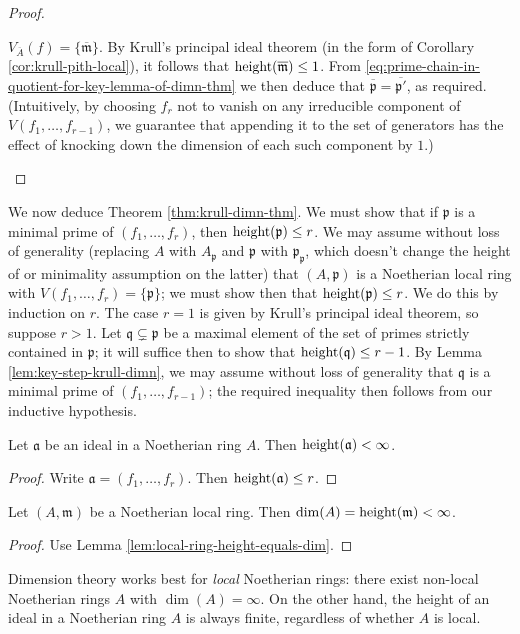 \documentclass[10pt]{article}
\begin{document}
\begin{proof}
\begin{enumerate}
    $V_{\overline{A}}(f)
    = \{\overline{\mathfrak{m}}\}$.    
    By Krull's principal
    ideal theorem (in the form of Corollary \ref{cor:krull-pith-local}),
    it follows that $\operatorname{height}(\overline{\mathfrak{m} }) \leq 1$.
    From
    \eqref{eq:prime-chain-in-quotient-for-key-lemma-of-dimn-thm}
    we then deduce that $\overline{\mathfrak{p} } =
    \overline{\mathfrak{p}'}$,
    as required.
    (Intuitively, by choosing $f_r$ not to vanish on any irreducible component
    of $V(f_1,\dotsc,f_{r-1})$,
    we guarantee that appending it to the set of generators has the effect
    of knocking down the dimension of each such component by $1$.)
  \end{enumerate}
\end{proof}

We now deduce Theorem \ref{thm:krull-dimn-thm}.  We must show that if \(\mathfrak{p}\) is a minimal prime of \((f_1,\dotsc,f_r)\), then \(\operatorname{height}(\mathfrak{p}) \leq r\).  We may assume without loss of generality (replacing \(A\) with \(A_\mathfrak{p}\) and \(\mathfrak{p}\) with \(\mathfrak{p}_\mathfrak{p}\), which doesn't change the height of or minimality assumption on the latter) that \((A,\mathfrak{p})\) is a Noetherian local ring with \(V(f_1,\dotsc,f_r) = \{\mathfrak{p}\}\); we must show then that \(\operatorname{height}(\mathfrak{p}) \leq r\).  We do this by induction on \(r\).  The case \(r = 1\) is given by Krull's principal ideal theorem, so suppose \(r > 1\).  Let \(\mathfrak{q} \subsetneq \mathfrak{p}\) be a maximal element of the set of primes strictly contained in \(\mathfrak{p}\); it will suffice then to show that \(\operatorname{height}(\mathfrak{q}) \leq r-1\).  By Lemma \ref{lem:key-step-krull-dimn}, we may assume without loss of generality that \(\mathfrak{q}\) is a minimal prime of \((f_1,\dotsc,f_{r-1})\); the required inequality then follows from our inductive hypothesis.

\begin{corollary}
  Let $\mathfrak{a}$ be an ideal in a Noetherian ring $A$.
  Then $\operatorname{height}(\mathfrak{a}) < \infty$.
\end{corollary}
\begin{proof}
  Write $\mathfrak{a} = (f_1,\dotsc,f_r)$.
  Then $\operatorname{height}(\mathfrak{a}) \leq r$.
\end{proof}
\begin{corollary}
  Let $(A,\mathfrak{m})$ be a Noetherian local ring.
  Then $\dim(A) = \operatorname{height}(\mathfrak{m}) < \infty$.
\end{corollary}
\begin{proof}
Use Lemma \ref{lem:local-ring-height-equals-dim}.
\end{proof}
\begin{remark}
  Dimension theory works best for \emph{local} Noetherian rings:
  there exist non-local Noetherian rings $A$ with
  $\dim(A) = \infty$.  On the other hand, the height of an ideal
  in a Noetherian ring $A$ is always finite, regardless of
  whether $A$ is local.
\end{remark}
\end{document}
